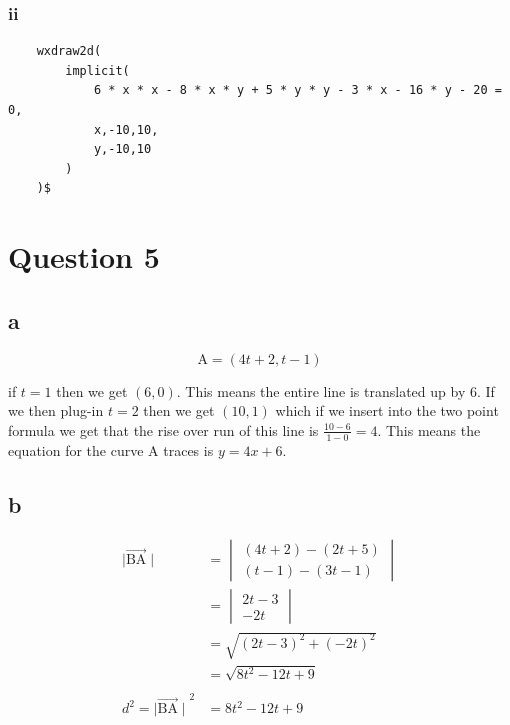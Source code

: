 \documentclass{article}
\begin{document}
\subsubsection{ii}

\begin{lstlisting}
	wxdraw2d(
        implicit(
            6 * x * x - 8 * x * y + 5 * y * y - 3 * x - 16 * y - 20 = 0,
            x,-10,10,
            y,-10,10
        )
	)$
\end{lstlisting}

\section{Question 5}

\subsection{a}

$$\mathrm A = (4 t + 2 , t - 1)$$

if $t=1$ then we get $(6,0)$. This means the entire line is translated up by $6$. If we then plug-in $t=2$ then we get $(10,1)$ which if we insert into the two point formula we get that the rise over run of this line is $\frac {10 - 6}{1 - 0} = 4$. This means the equation for the curve $\mathrm A$ traces is $y = 4x + 6$.

\subsection{b}

\begin{align*}
	\mid\vec{\mathrm{BA}}\mid          & =
	\begin {vmatrix}
	(4t + 2) - (2t + 5)                                     \\
	( t - 1) - (3t - 1)
	\end {vmatrix}                                          \\
	                                   & =
	\begin {vmatrix}
	2t - 3                                                  \\
	-2t
	\end {vmatrix}                                          \\
	                                   & =
	\sqrt {(2t - 3)^2 + (-2t)^2}                            \\
	                                   & =
	\sqrt {8t^2 -12t + 9}                                   \\
	\\
	d^2 ={\mid\vec{\mathrm{BA}}\mid}^2 & = 8 t^2 - 12 t + 9
\end{align*}
\end{document}
